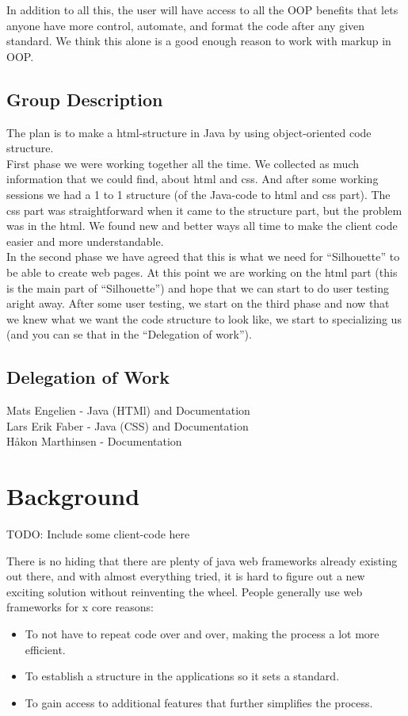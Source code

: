 \documentclass[12pt]{article}
\begin{document}
In addition to all this, the user will have access to all the OOP benefits that lets anyone have more control, automate, and format the code after any given standard. We think this alone is a good enough reason to work with markup in OOP.

    \subsection{Group Description}
    The plan is to make a html-structure in Java by using object-oriented code structure.\\
    First phase we were working together all the time. We collected as much information that we could find, about html and css. And after some working sessions we had a 1 to 1 structure (of the Java-code to html and css part). The css part was straightforward when it came to the structure part, but the problem was in the html. We found new and better ways all time to make the client code easier and more understandable.\\
    In the second phase we have agreed that this is what we need for “Silhouette” to be able to create web pages. At this point we are working on the html part (this is the main part of “Silhouette”) and hope that we can start to do user testing aright away. After some user testing, we start on the third phase and now that we knew what we want the code structure to look like, we start to specializing us (and you can se that in the “Delegation of work”). 

    \subsection{Delegation of Work}
    Mats Engelien - Java (HTMl) and Documentation\\
    Lars Erik Faber - Java (CSS) and Documentation\\
    Håkon Marthinsen - Documentation

\section{Background}
TODO: Include some client-code here

There is no hiding that there are plenty of java web frameworks already existing out there, and with almost everything tried, it is hard to figure out a new exciting solution without reinventing the wheel. People generally use web frameworks for x core reasons:

\begin{itemize}
    \item To not have to repeat code over and over, making the process a lot more efficient.
    \item To establish a structure in the applications so it sets a standard.
    \item To gain access to additional features that further simplifies the process.
\end{itemize}
\end{document}
